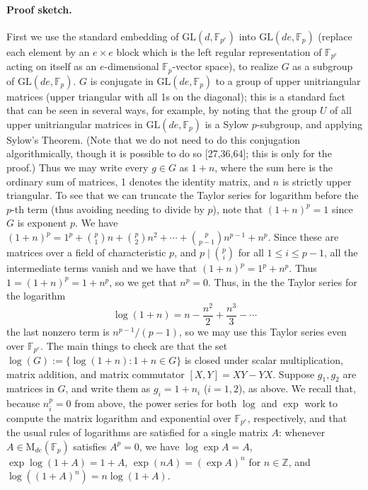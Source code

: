 \paragraph{Proof sketch.}
First we use the standard embedding of $\mathrm{GL}(d,\mathbb F_{p^e})$ into $\mathrm{GL}(de,\mathbb F_p)$ (replace each element by an $e\times e$ block which is the left regular representation of $\mathbb F_{p^e}$ acting on itself as an $e$-dimensional $\mathbb F_p$-vector space), to realize $G$ as a subgroup of $\mathrm{GL}(de,\mathbb F_p)$. $G$ is conjugate in $\mathrm{GL}(de,\mathbb F_p)$ to a group of upper unitriangular matrices (upper triangular with all 1s on the diagonal); this is a standard fact that can be seen in several ways, for example, by noting that the group $U$ of all upper unitriangular matrices in $\mathrm{GL}(de,\mathbb F_p)$ is a Sylow $p$-subgroup, and applying Sylow's Theorem. (Note that we do not need to do this conjugation algorithmically, though it is possible to do so [27,36,64]; this is only for the proof.) Thus we may write every $g\in G$ as $1+n$, where the sum here is the ordinary sum of matrices, 1 denotes the identity matrix, and $n$ is strictly upper triangular. To see that we can truncate the Taylor series for logarithm before the $p$-th term (thus avoiding needing to divide by $p$), note that $(1+n)^p=1$ since $G$ is exponent $p$. We have $(1+n)^p=1^p+\binom p1n+\binom p2n^2+\cdots+\binom p{p-1}n^{p-1}+n^p$. Since these are matrices over a field of characteristic $p$, and $p\mid\binom pi$ for all $1\le i\le p-1$, all the intermediate terms vanish and we have that $(1+n)^p=1^p+n^p$. Thus $1=(1+n)^p=1+n^p$, so we get that $n^p=0$. Thus, in the the Taylor series for the logarithm
\[\log(1+n)=n-\frac{n^2}2+\frac{n^3}3-\cdots\]
the last nonzero term is $n^{p-1}/(p-1)$, so we may use this Taylor series even over $\mathbb F_{p^e}$.
The main things to check are that the set $\log(G):=\{\log(1+n):1+n\in G\}$ is closed under scalar multiplication, matrix addition, and matrix commutator $[X,Y]=XY-YX$. Suppose $g_1,g_2$ are matrices in $G$, and write them as $g_i=1+n_i$ ($i=1,2$), as above. We recall that, because $n_i^p=0$ from above, the power series for both $\log$ and $\exp$ work to compute the matrix logarithm and exponential over $\mathbb F_{p^e}$, respectively, and that the usual rules of logarithms are satisfied for a single matrix $A$: whenever $A\in\mathrm M_{de}(\mathbb F_p)$ satisfies $A^p=0$, we have $\log\exp A=A$, $\exp\log(1+A)=1+A$, $\exp(nA)=(\exp A)^n$ for $n\in\mathbb Z$, and $\log((1+A)^n)=n\log(1+A)$.
